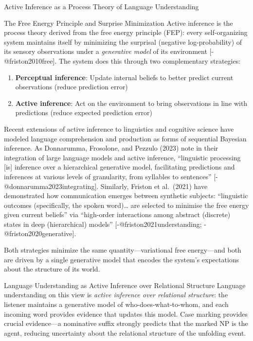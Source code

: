 \documentclass[
  ignorenonframetext,
]{beamer}
\providecommand{\tightlist}{%
  \setlength{\itemsep}{0pt}\setlength{\parskip}{0pt}}
\begin{document}
\begin{frame}{Active Inference as a Process Theory of Language
Understanding}
\protect{}\label{active-inference-as-a-process-theory-of-language-understanding}
\begin{block}{The Free Energy Principle and Surprise Minimization}
\protect{}\label{the-free-energy-principle-and-surprise-minimization}
Active inference is the process theory derived from the free energy
principle (FEP): every self-organizing system maintains itself by
minimizing the surprisal (negative log-probability) of its sensory
observations under a \emph{generative model} of its environment
{[}-@friston2010free{]}. The system does this through two complementary
strategies:

\begin{enumerate}
\tightlist
\item
  \textbf{Perceptual inference}: Update internal beliefs to better
  predict current observations (reduce prediction error)
\item
  \textbf{Active inference}: Act on the environment to bring
  observations in line with predictions (reduce expected prediction
  error)
\end{enumerate}

Recent extensions of active inference to linguistics and cognitive
science have modeled language comprehension and production as forms of
sequential Bayesian inference. As Donnarumma, Frosolone, and Pezzulo
(2023) note in their integration of large language models and active
inference, ``linguistic processing {[}is{]} inference over a
hierarchical generative model, facilitating predictions and inferences
at various levels of granularity, from syllables to sentences''
{[}-@donnarumma2023integrating{]}. Similarly, Friston et al.~(2021) have
demonstrated how communication emerges between synthetic subjects:
``linguistic outcomes (specifically, the spoken word)\ldots{} are
selected to minimise the free energy given current beliefs'' via
``high-order interactions among abstract (discrete) states in deep
(hierarchical) models'' {[}-@friston2021understanding;
-@friston2020generative{]}.

Both strategies minimize the same quantity---variational free
energy---and both are driven by a single generative model that encodes
the system's expectations about the structure of its world.
\end{block}

\begin{block}{Language Understanding as Active Inference over Relational
Structure}
\protect{}\label{language-understanding-as-active-inference-over-relational-structure}
Language understanding on this view is \emph{active inference over
relational structure}: the listener maintains a generative model of
who-does-what-to-whom, and each incoming word provides evidence that
updates this model. Case marking provides crucial evidence---a
nominative suffix strongly predicts that the marked NP is the agent,
reducing uncertainty about the relational structure of the unfolding
event.


\end{block}
\end{frame}
\end{document}

